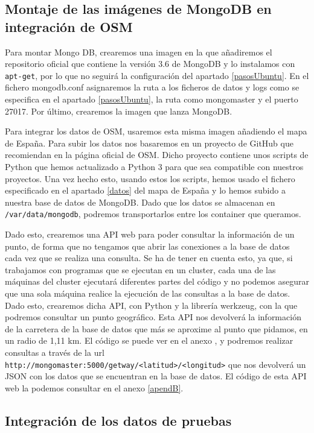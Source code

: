 \subsection{Montaje de las imágenes de MongoDB en integración de
  OSM\label{montMongo}}

Para montar Mongo DB, crearemos una imagen en la que añadiremos el
repositorio oficial que contiene la versión 3.6 de MongoDB y lo instalamos
con {\tt apt-get}, por lo que no seguirá la configuración del apartado
\ref{pasosUbuntu}. En el fichero mongodb.conf asignaremos la ruta a los
ficheros de datos y logs como se especifica en el apartado
\ref{pasosUbuntu}, la ruta como mongomaster y el puerto 27017. Por último,
crearemos la imagen que lanza MongoDB.

Para integrar los datos de OSM, usaremos esta misma imagen añadiendo el
mapa de España. Para subir los datos nos basaremos en un proyecto de GitHub
que recomiendan en la página oficial de OSM. Dicho proyecto contiene unos
scripts de Python que hemos actualizado a Python 3 para que sea compatible
con nuestros proyectos. Una vez hecho esto, usando estos los scripts, hemos
usado el fichero especificado en el apartado \ref{datos} del mapa de España
y lo hemos subido a nuestra base de datos de MongoDB. Dado que los datos se
almacenan en {\tt /var/data/mongodb}, podremos transportarlos entre los
container que queramos.

Dado esto, crearemos una API web para poder consultar la información de un
punto, de forma que no tengamos que abrir las conexiones a la base de datos
cada vez que se realiza una consulta. Se ha de tener en cuenta esto, ya
que, si trabajamos con programas que se ejecutan en un cluster, cada una de
las máquinas del cluster ejecutará diferentes partes del código y no
podemos asegurar que una sola máquina realice la ejecución de las consultas
a la base de datos. Dado esto, crearemos dicha API, con Python y la
librería werkzeug, con la que podremos consultar un punto geográfico. Esta
API nos devolverá la información de la carretera de la base de datos que
más se aproxime al punto que pidamos, en un radio de 1,11 km. El código se
puede ver en el anexo %
, y podremos realizar consultas a través de la url {\tt
  http://mongomaster:5000/getway/<latitud>/<longitud>} que nos devolverá un
JSON con los datos que se encuentran en la base de datos. El código de esta
API web la podemos consultar en el anexo \ref{apendB}.

\subsection {Integración de los datos de pruebas \label{integracion}}

